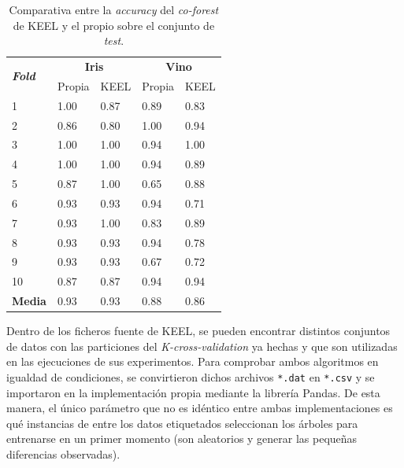 \begin{table}
	\begin{centering}
		
		\begin{tabular}{@{} p{4em} p{5em} p{7em} p{7em} p{7em} @{}}
			\toprule
			\multirow{2}{*}{\textbf{\textit{ \hfil Fold}}} & \multicolumn{2}{c}{\hfil \textbf{Iris}}& \multicolumn{2}{c}{\hfil \textbf{Vino}} \\
			\cmidrule{2-3} \cmidrule{4-5}
			& \hfil Propia & \hfil KEEL & \hfil Propia & \hfil KEEL\\ 
			\toprule
			\hfil 1 &\hfil 1.00	&\hfil 0.87	& \hfil 0.89  & \hfil0.83 \\
			\hfil 2 &\hfil 0.86	&\hfil 0.80	& \hfil 1.00 	&  \hfil 0.94 \\
			\hfil 3 & \hfil 1.00	& \hfil 1.00	& \hfil 0.94	& \hfil 1.00 \\
			\hfil 4 & \hfil 1.00	& \hfil 1.00	& \hfil 0.94	& \hfil 0.89 \\
			\hfil 5 & \hfil 0.87	& \hfil 1.00	& \hfil 0.65	& \hfil 0.88 \\
			\hfil 6 & \hfil 0.93	& \hfil 0.93	& \hfil 0.94	& \hfil 0.71 \\
			\hfil 7 & \hfil 0.93	& \hfil 1.00	& \hfil 0.83	& \hfil 0.89 \\
			\hfil 8 & \hfil 0.93	& \hfil 0.93	& \hfil 0.94	& \hfil 0.78 \\
			\hfil 	9 & \hfil 0.93	& \hfil 0.93	& \hfil 0.67	& \hfil 0.72 \\
			\hfil 10& \hfil 0.87	& \hfil 0.87	& \hfil 0.94	& \hfil 0.94 \\
			\midrule
			\hfil \textbf{Media} 			& \hfil 0.93	& \hfil 0.93	& \hfil 0.88	& \hfil 0.86 \\
			\bottomrule
		\end{tabular}
	\end{centering}
	\caption[\textit{Co-forest}: comparativa entre KEEL y la implementación propia]{Comparativa entre la \textit{accuracy} del \textit{co-forest} de KEEL y el propio sobre el conjunto de \textit{test}.}
	\label{tabla_coforest_keelvsnuestro}	
\end{table}

Dentro de los ficheros fuente de KEEL, se pueden encontrar distintos conjuntos de datos con las particiones del \textit{K-cross-validation} ya hechas y que son utilizadas en las ejecuciones de sus experimentos. Para comprobar ambos algoritmos en igualdad de condiciones, se convirtieron dichos archivos \texttt{*.dat} en \texttt{*.csv} y se importaron en la implementación propia mediante la librería Pandas. De esta manera, el único parámetro que no es idéntico entre ambas implementaciones es qué instancias de entre los datos etiquetados seleccionan los árboles para entrenarse en un primer momento (son aleatorios y generar las pequeñas diferencias observadas).

